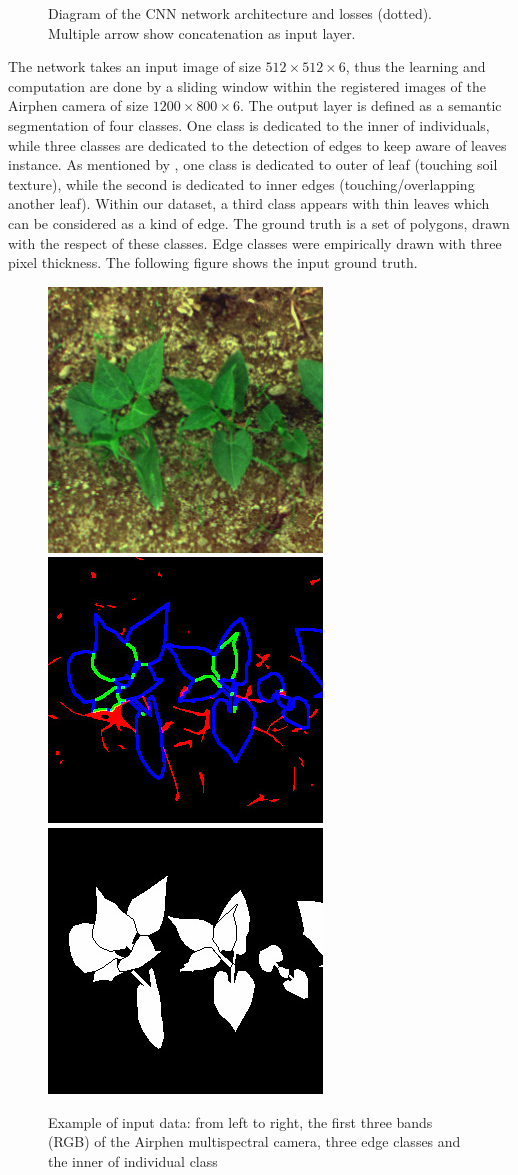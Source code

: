 \documentclass[../thesis.tex]{subfiles}
\begin{document}
    \begin{figure}[H]
        \centering
        
        \caption{Diagram of the CNN network architecture and losses (dotted). Multiple arrow show concatenation as input layer.}
        \label{fig:07-diagram1}
    \end{figure}
    
    The network takes an input image of size $512 \times 512 \times 6$, thus the learning and computation are done by a sliding window within the registered images of the Airphen camera of size  $1200 \times 800 \times 6$. The output layer is defined as a semantic segmentation of four classes. One class is dedicated to the inner of individuals, while three classes are dedicated to the detection of edges to keep aware of leaves instance. As mentioned by \cite{bell2019leaf}, one class is dedicated to outer of leaf (touching soil texture), while the second is dedicated to inner edges (touching/overlapping another leaf). Within our dataset, a third class appears with thin leaves which can be considered as a kind of edge. The ground truth is a set of polygons, drawn with the respect of these classes. Edge classes were empirically drawn with three pixel thickness. The following figure shows the input ground truth.
    
    \begin{figure}[H]
        \centering
        \includegraphics[width=0.25\linewidth]{img/leaf/dataset-color} \hspace{1em}
        \includegraphics[width=0.25\linewidth]{img/leaf/dataset-edges} \hspace{1em}
        \includegraphics[width=0.25\linewidth]{img/leaf/dataset-body}
        \caption{Example of input data: from left to right, the first three bands (RGB) of the Airphen multispectral camera, three edge classes and the inner of individual class}
        \label{fig:07-dataset-body}
    \end{figure}
    
\end{document}
